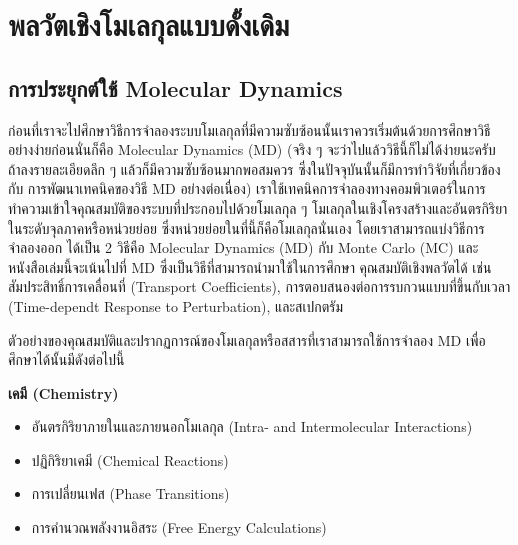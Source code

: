 

\chapter{พลวัตเชิงโมเลกุลแบบดั้งเดิม}
\label{ch:md}

\section{การประยุกต์ใช้ Molecular Dynamics}

ก่อนที่เราจะไปศึกษาวิธีการจำลองระบบโมเลกุลที่มีความซับซ้อนนั้นเราควรเริ่มต้นด้วยการศึกษาวิธีอย่างง่ายก่อนนั่นก็คือ Molecular Dynamics (MD)
(จริง ๆ จะว่าไปแล้ววิธีนี้ก็ไม่ได้ง่ายนะครับ ถ้าลงรายละเอียดลึก ๆ แล้วก็มีความซับซ้อนมากพอสมควร ซึ่งในปัจจุบันนั้นก็มีการทำวิจัยที่เกี่ยวข้องกับ%
การพัฒนาเทคนิคของวิธี MD อย่างต่อเนื่อง) เราใช้เทคนิคการจำลองทางคอมพิวเตอร์ในการทำความเข้าใจคุณสมบัติของระบบที่ประกอบไปด้วยโมเลกุล
ๆ โมเลกุลในเชิงโครงสร้างและอันตรกิริยาในระดับจุลภาคหรือหน่วยย่อย ซึ่งหน่วยย่อยในที่นี้ก็คือโมเลกุลนั่นเอง โดยเราสามารถแบ่งวิธีการจำลองออก%
ได้เป็น 2 วิธีคือ Molecular Dynamics (MD) กับ Monte Carlo (MC) และหนังสือเล่มนี้จะเน้นไปที่ MD ซึ่งเป็นวิธีที่สามารถนำมาใช้ในการศึกษา%
คุณสมบัติเชิงพลวัตได้ เช่น สัมประสิทธิ์การเคลื่อนที่ (Transport Coefficients), การตอบสนองต่อการรบกวนแบบที่ขึ้นกับเวลา (Time-dependt
Response to Perturbation), และสเปกตรัม

ตัวอย่างของคุณสมบัติและปรากฏการณ์ของโมเลกุลหรือสสารที่เราสามารถใช้การจำลอง MD เพื่อศึกษาได้นั้นมีดังต่อไปนี้

\noindent \textbf{เคมี (Chemistry)}

\begin{itemize}[topsep=0pt,noitemsep]
    \setlength\itemsep{0.5em}
    \item อันตรกิริยาภายในและภายนอกโมเลกุล (Intra- and Intermolecular Interactions)

    \item ปฏิกิริยาเคมี (Chemical Reactions)

    \item การเปลี่ยนเฟส (Phase Transitions)

    \item การคำนวณพลังงานอิสระ (Free Energy Calculations)
\end{itemize}

